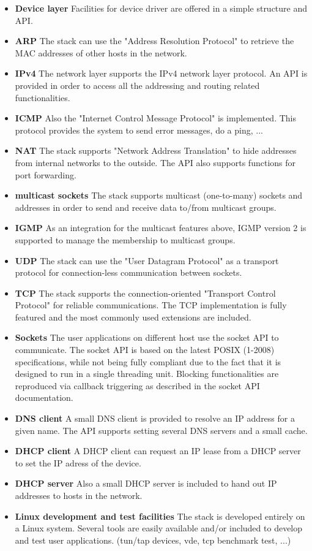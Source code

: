 \begin{itemize}
\item \textbf{Device layer} Facilities for device driver are offered in a simple
					structure and API.
\item \textbf{ARP} The stack can use the "Address Resolution Protocol" to retrieve
					the MAC addresses of other hosts in the network.
\item \textbf{IPv4} The network layer supports the IPv4 network layer
          protocol. An API is provided in order to access all the
          addressing and routing related functionalities.
\item \textbf{ICMP} Also the "Internet Control Message Protocol" is implemented. This
					protocol provides the system to send error messages, do a ping, ...
\item \textbf{NAT} The stack supports "Network Address Translation" to hide addresses
					from internal networks to the outside. The API also supports functions
					for port forwarding.
\item \textbf{multicast sockets} The stack supports multicast (one-to-many)
          sockets and addresses in order to send and receive data to/from
          multicast groups.
\item \textbf{IGMP} As an integration for the multicast features above, IGMP version 2
          is supported to manage the membership to multicast groups.
\item \textbf{UDP} The stack can use the "User Datagram Protocol" as a transport protocol
					for connection-less communication between sockets.
\item \textbf{TCP} The stack supports the connection-oriented "Transport Control Protocol"
					for reliable communications. The TCP implementation is fully
          featured and the most commonly used extensions are included.
\item \textbf{Sockets} The user applications on different host use the socket API to communicate.
					The socket API is based on the latest POSIX (1-2008)
          specifications, while not being fully compliant due to the fact
          that it is designed to run in a single threading unit. Blocking
          functionalities are reproduced via callback triggering as
          described in the socket API documentation.
\item \textbf{DNS client} A small DNS client is provided to resolve an IP address for a given name.
					The API supports setting several DNS servers and a small cache.
\item \textbf{DHCP client} A DHCP client can request an IP lease from a DHCP server to set the IP
					adress of the device.
\item \textbf{DHCP server} Also a small DHCP server is included to hand out IP addresses to hosts
					in the network.
\item \textbf{Linux development and test facilities} The stack is developed entirely on a Linux system.
					Several tools are easily available and/or included to develop and test user applications.
					(tun/tap devices, vde, tcp benchmark test, ...)
\end{itemize}

